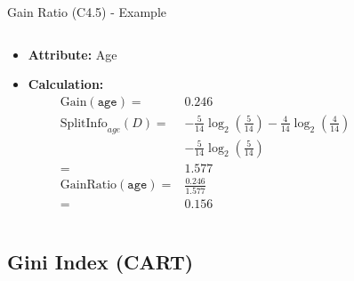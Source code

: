 \begin{frame}{Gain Ratio (C4.5) - Example}
	\begin{columns}
		\begin{column}{0.45\textwidth}
			\vspace*{-0.5em}
			\begin{itemize}
				\item \textbf{Attribute:} Age \medskip
				\item \textbf{Calculation:}
				      {
					      \footnotesize
					      \begin{align*}
						      \text{Gain}(\texttt{age})  =     & 0.246                                                                                        \\
						      \text{SplitInfo}_{age}(D)  =     & -\frac{5}{14} \log_2\left(\frac{5}{14}\right) - \frac{4}{14} \log_2\left(\frac{4}{14}\right) \\
						                                       & - \frac{5}{14} \log_2\left(\frac{5}{14}\right)                                               \\
						      =                                & 1.577                                                                                        \\
						      \text{GainRatio}(\texttt{age}) = & \frac{0.246}{1.577}                                                                          \\
						      =                                & 0.156
					      \end{align*}
				      }
			\end{itemize}


		\end{column}
		\begin{column}{0.45\textwidth}
			\vspace*{-0.5cm}
			\begin{center}
				\scalebox{0.7}{
					
				}
			\end{center}
		\end{column}
	\end{columns}
\end{frame}

\subsection{Gini Index (CART)}

